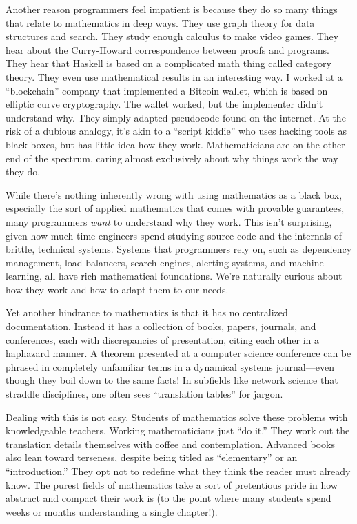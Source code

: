Another reason programmers feel impatient is because they do so many things
that relate to mathematics in deep ways. They use graph theory for data
structures and search. They study enough calculus to make video games. They
hear about the Curry-Howard correspondence between proofs and programs. They
hear that Haskell is based on a complicated math thing called category theory.
They even use mathematical results in an interesting way. I worked at a
``blockchain'' company that implemented a Bitcoin wallet, which is based on
elliptic curve cryptography. The wallet worked, but the implementer didn't
understand why. They simply adapted pseudocode found on the internet. At the
risk of a dubious analogy, it's akin to a ``script kiddie'' who uses hacking
tools as black boxes, but has little idea how they work. Mathematicians are on
the other end of the spectrum, caring almost exclusively about why things work
the way they do.

While there's nothing inherently wrong with using mathematics as a black box,
especially the sort of applied mathematics that comes with provable guarantees,
many programmers \emph{want} to understand why they work.  This isn't
surprising, given how much time engineers spend studying source code and the
internals of brittle, technical systems. Systems that programmers rely on, such
as dependency management, load balancers, search engines, alerting systems, and
machine learning, all have rich mathematical foundations.  We're naturally
curious about how they work and how to adapt them to our needs.

Yet another hindrance to mathematics is that it has no centralized
documentation. Instead it has a collection of books, papers, journals, and
conferences, each with discrepancies of presentation, citing each other in a
haphazard manner. A theorem presented at a computer science conference can be
phrased in completely unfamiliar terms in a dynamical systems journal---even
though they boil down to the same facts!  In subfields like network science
that straddle disciplines, one often sees ``translation tables'' for jargon.

Dealing with this is not easy. Students of mathematics solve these problems
with knowledgeable teachers. Working mathematicians just ``do it.'' They work
out the translation details themselves with coffee and contemplation. Advanced
books also lean toward terseness, despite being titled as ``elementary'' or an
``introduction.'' They opt not to redefine what they think the reader must
already know. The purest fields of mathematics take a sort of pretentious
pride in how abstract and compact their work is (to the point where many
students spend weeks or months understanding a single chapter!).

